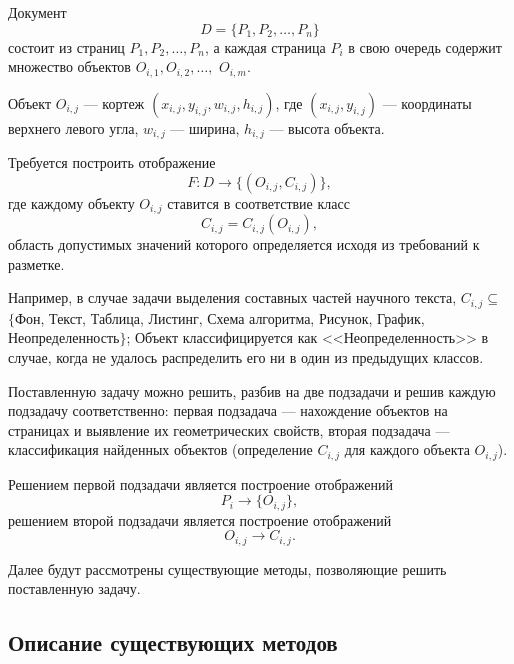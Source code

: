 Документ
\begin{equation}
    D = \{ P_1, P_2 , \dots, P_n \}
    \label{eq:d}
\end{equation}
состоит из страниц $ P_1, P_2, \dots, P_n $, а каждая страница $ P_i $ в свою очередь содержит множество объектов $ O_{i,1}, O_{i,2}, \dots, $ $O_{i,m} $.

Объект $O_{i,j}$ --- кортеж $(x_{i,j}, y_{i,j}, w_{i,j}, h_{i,j})$, где $(x_{i,j}, y_{i,j})$ --- координаты верхнего левого угла, $w_{i,j}$ --- ширина, $h_{i,j}$ --- высота объекта.

Требуется построить отображение
\begin{equation}
    F : D \to \{(O_{i,j}, C_{i,j})\},
    \label{eq:f}
\end{equation}
где каждому объекту $O_{i,j}$ ставится в соответствие класс
\begin{equation}
    C_{i,j} = C_{i,j}(O_{i,j}),
    \label{eq:c}
\end{equation}
область допустимых значений которого определяется исходя из требований к разметке.

Например, в случае задачи выделения составных частей научного текста, $C_{i,j} \subseteq$ $\{${Фон, Текст, Таблица, Листинг, Схема алгоритма, Рисунок, График, Неопределенность}$\}$;
Объект классифицируется как <<Неопределенность>> в случае, когда не удалось распределить его ни в один из предыдущих классов.

Поставленную задачу можно решить, разбив на две подзадачи и решив каждую подзадачу соответственно: первая подзадача --- нахождение объектов на страницах и выявление их геометрических свойств, вторая подзадача --- классификация найденных объектов (определение $C_{i,j}$ для каждого объекта $O_{i,j}$).

Решением первой подзадачи является построение отображений
\begin{equation}
    P_i \to \{ O_{i,j} \},
    \label{eq:p}
\end{equation}
решением второй подзадачи является построение отображений
\begin{equation}
    O_{i,j} \to C_{i,j}.
    \label{eq:o}
\end{equation}

Далее будут рассмотрены существующие методы, позволяющие решить поставленную задачу.

\subsection{Описание существующих методов}

